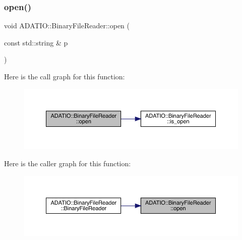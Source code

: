 \mbox{\label{classADATIO_1_1BinaryFileReader_a5a7c5bb025902fd04642fb154542dc6a}} 
\subsubsection{\texorpdfstring{open()}{open()}\hspace{0.1cm}{\footnotesize\ttfamily [2/3]}}
{\footnotesize\ttfamily void A\+D\+A\+T\+I\+O\+::\+Binary\+File\+Reader\+::open (\begin{DoxyParamCaption}\item[{const std\+::string \&}]{p }\end{DoxyParamCaption})}

Here is the call graph for this function\+:
\nopagebreak
\begin{figure}[H]
\begin{center}
\leavevmode
\includegraphics[width=350pt]{df/d41/classADATIO_1_1BinaryFileReader_a5a7c5bb025902fd04642fb154542dc6a_cgraph}
\end{center}
\end{figure}
Here is the caller graph for this function\+:
\nopagebreak
\begin{figure}[H]
\begin{center}
\leavevmode
\includegraphics[width=350pt]{df/d41/classADATIO_1_1BinaryFileReader_a5a7c5bb025902fd04642fb154542dc6a_icgraph}
\end{center}
\end{figure}
\mbox{\label{classADATIO_1_1BinaryFileReader_a5a7c5bb025902fd04642fb154542dc6a}} 
